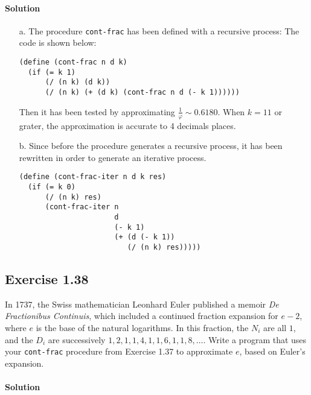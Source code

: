 \paragraph{Solution}
\begin{itemize}
    \item[a.] The procedure \texttt{cont-frac} has been defined with a recursive process: The code is shown below:
\begin{lstlisting}
(define (cont-frac n d k)
  (if (= k 1)
      (/ (n k) (d k))
      (/ (n k) (+ (d k) (cont-frac n d (- k 1))))))
\end{lstlisting}
        Then it has been tested by approximating $ \frac{1}{\varphi} \sim 0.6180 $. When $ k = 11 $ or grater, the approximation is
        accurate to 4 decimals places.
    \item[b.] Since before the procedure generates a recursive process, it has been rewritten in order to generate an iterative
        process.
\begin{lstlisting}
(define (cont-frac-iter n d k res)
  (if (= k 0)
      (/ (n k) res)
      (cont-frac-iter n 
                      d 
                      (- k 1) 
                      (+ (d (- k 1)) 
                         (/ (n k) res)))))
\end{lstlisting}   
\end{itemize}


\subsection*{Exercise 1.38}
In 1737, the Swiss mathematician Leonhard Euler published a memoir \textit{De Fractionibus Continuis}, which
included a continued fraction expansion for $ e - 2 $, where $ e $ is the base of the natural logarithms.
In this fraction, the $ N_{i} $ are all $ 1 $, and the $ D_{i} $ are successively $ 1, 2, 1, 1, 4, 1, 1, 6, 1, 1, 8, \dots $.
Write a program that uses your \texttt{cont-frac} procedure from Exercise 1.37 to approximate $ e $, based on Euler's expansion.

\paragraph{Solution}